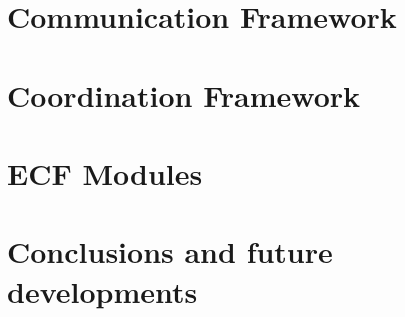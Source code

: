 \documentclass{Configuration_Files/PoliMi3i_thesis}
\begin{document}
\chapter{Communication Framework}
\label{ch:communication}


\chapter{Coordination Framework}
\label{ch:coordination}


\chapter{ECF Modules}
\label{ch:modules}


\chapter{Conclusions and future developments}
\label{ch:conclusions}





\cleardoublepage
{} %
\end{document}
